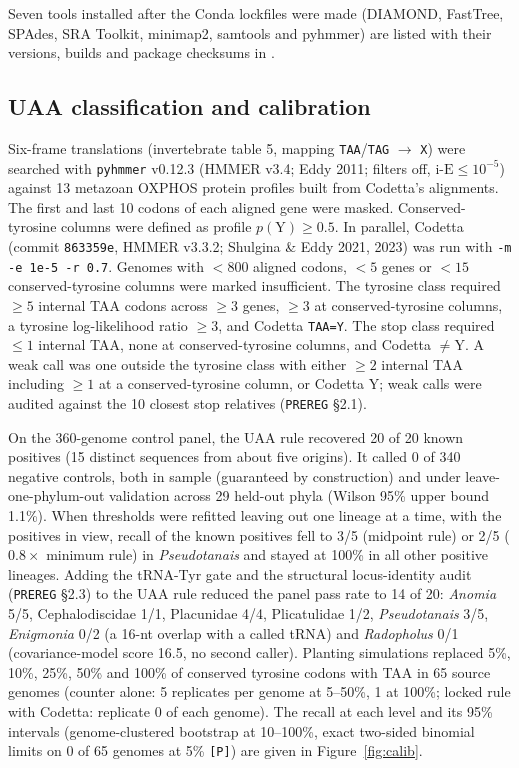 \documentclass[11pt, a4paper]{article}
\begin{document}
Seven tools installed after the Conda lockfiles were made (DIAMOND, FastTree, SPAdes, SRA Toolkit, minimap2, samtools and pyhmmer) are listed with their versions, builds and package checksums in .

\subsection{UAA classification and calibration}
Six-frame translations (invertebrate table 5, mapping \texttt{TAA}/\texttt{TAG} $\to$ \texttt{X}) were searched with \texttt{pyhmmer} v0.12.3 (HMMER v3.4; Eddy 2011; filters off, $\mathrm{i\text{-}E} \le 10^{-5}$) against 13 metazoan OXPHOS protein profiles built from Codetta's alignments. The first and last 10 codons of each aligned gene were masked. Conserved-tyrosine columns were defined as profile $p(\mathrm{Y}) \ge 0.5$. In parallel, Codetta (commit \texttt{863359e}, HMMER v3.3.2; Shulgina \& Eddy 2021, 2023) was run with \texttt{-m -e 1e-5 -r 0.7}. Genomes with $<800$ aligned codons, $<5$ genes or $<15$ conserved-tyrosine columns were marked insufficient. The tyrosine class required $\ge 5$ internal TAA codons across $\ge 3$ genes, $\ge 3$ at conserved-tyrosine columns, a tyrosine log-likelihood ratio $\ge 3$, and Codetta \texttt{TAA=Y}. The stop class required $\le 1$ internal TAA, none at conserved-tyrosine columns, and Codetta $\ne \mathrm{Y}$. A weak call was one outside the tyrosine class with either $\ge 2$ internal TAA including $\ge 1$ at a conserved-tyrosine column, or Codetta Y; weak calls were audited against the 10 closest stop relatives (\texttt{PREREG} \S 2.1).

On the 360-genome control panel, the UAA rule recovered 20 of 20 known positives (15 distinct sequences from about five origins). It called 0 of 340 negative controls, both in sample (guaranteed by construction) and under leave-one-phylum-out validation across 29 held-out phyla (Wilson 95\% upper bound 1.1\%). When thresholds were refitted leaving out one lineage at a time, with the positives in view, recall of the known positives fell to 3/5 (midpoint rule) or 2/5 ($0.8\times$ minimum rule) in \textit{Pseudotanais} and stayed at 100\% in all other positive lineages. Adding the tRNA-Tyr gate and the structural locus-identity audit (\texttt{PREREG} \S 2.3) to the UAA rule reduced the panel pass rate to 14 of 20: \textit{Anomia} 5/5, Cephalodiscidae 1/1, Placunidae 4/4, Plicatulidae 1/2, \textit{Pseudotanais} 3/5, \textit{Enigmonia} 0/2 (a 16-nt overlap with a called tRNA) and \textit{Radopholus} 0/1 (covariance-model score 16.5, no second caller). Planting simulations replaced 5\%, 10\%, 25\%, 50\% and 100\% of conserved tyrosine codons with TAA in 65 source genomes (counter alone: 5 replicates per genome at 5--50\%, 1 at 100\%; locked rule with Codetta: replicate 0 of each genome). The recall at each level and its 95\% intervals (genome-clustered bootstrap at 10--100\%, exact two-sided binomial limits on 0 of 65 genomes at 5\% \texttt{[P]}) are given in Figure~\ref{fig:calib}.
\end{document}
